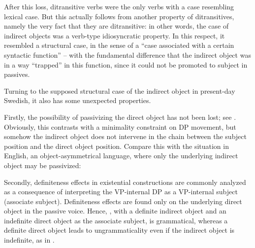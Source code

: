 \documentclass[output=paper]{langscibook}
\begin{document}
\begin{sloppypar}
After this loss, ditransitive verbs were the only verbs with a case resembling lexical case. But this actually follows from another property of ditransitives, namely the very fact that they are ditransitive: in other words, the case of indirect objects was a verb-type idiosyncratic property. In this respect, it resembled a structural case, in the sense of a “case associated with a certain syntactic function” – with the fundamental difference that the indirect object was in a way “trapped” in this function, since it could not be promoted to subject in passives.
\end{sloppypar}


Turning to the supposed structural case of the indirect object in present-day Swedish, it also has some unexpected properties. 



Firstly, the possibility of passivizing the direct object has not been lost; see . Obviously, this contrasts with a minimality constraint on DP movement, but somehow the indirect object does not intervene in the chain between the subject position and the direct object position. Compare this with the situation in English, an object-asymmetrical language, where only the underlying indirect object may be passivized:


\ea%
    \label{ex:falk:6}
\z
\z


Secondly, definiteness effects in existential constructions are commonly analyzed as a consequence of interpreting the VP-internal DP as a VP-internal subject (associate subject). Definiteness effects are found only on the underlying direct object in the passive voice. Hence, , with a definite indirect object and an indefinite direct object as the associate subject, is grammatical, whereas a definite direct object leads to ungrammaticality even if the indirect object is indefinite, as in .

\ea%
    \label{ex:falk:7}

\z
\z
\end{document}
